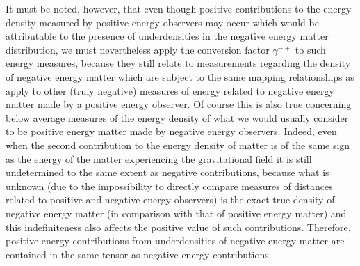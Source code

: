 \documentclass[notitlepage,12pt]{report}
\begin{document}
It must be noted, however, that even though positive contributions to the energy density measured by positive energy observers may occur which would be attributable to the presence of underdensities in the negative energy matter distribution, we must nevertheless apply the conversion factor $\gamma^{-+}$ to such energy measures, because they still relate to measurements regarding the density of negative energy matter which are subject to the same mapping relationships as apply to other (truly negative) measures of energy related to negative energy matter made by a positive energy observer. Of course this is also true concerning below average measures of the energy density of what we would usually consider to be positive energy matter made by negative energy observers. Indeed, even when the second contribution to the energy density of matter is of the same sign as the energy of the matter experiencing the gravitational field it is still undetermined to the same extent as negative contributions, because what is unknown (due to the impossibility to directly compare measures of distances related to positive and negative energy observers) is the exact true density of negative energy matter (in comparison with that of positive energy matter) and this indefiniteness also affects the positive value of such contributions. Therefore, positive energy contributions from underdensities of negative energy matter are contained in the same tensor as negative energy contributions.
\end{document}
